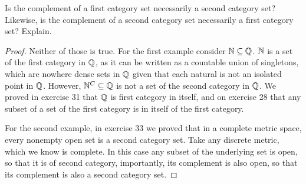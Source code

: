 \begin{exercise}{38}
Is the complement of a first category set necessarily a second category set?
Likewise, is the complement of a second category set necessarily a first category set?
Explain.
\end{exercise}
\begin{proof}
Neither of those is true.
For the first example consider $\mathbb{N} \subseteq \mathbb{Q}$.
$\mathbb{N}$ is a set of the first category in $\mathbb{Q}$, as it can be written as a countable union of singletons, which are nowhere dense sets in $\mathbb{Q}$ given that each natural is not an isolated point in $\mathbb{Q}$.
However, $\mathbb{N}^C \subseteq \mathbb{Q}$ is not a set of the second category in $\mathbb{Q}$.
We proved in exercise 31 that $\mathbb{Q}$ is first category in itself, and on exercise 28 that any subset of a set of the first category is in itself of the first category.

For the second example, in exercise 33 we proved that in a complete metric space, every nonempty open set is a second category set.
Take any discrete metric, which we know is complete.
In this case any subset of the underlying set is open, so that it is of second category, importantly, its complement is also open, so that its complement is also a second category set.
\end{proof} 

